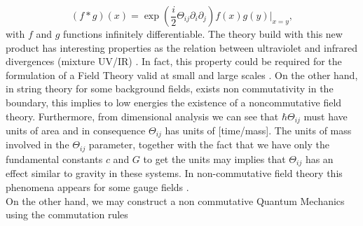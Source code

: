 \documentclass[a4paper,12pt]{article}
\begin{document}
\begin{equation}
(f*g)(x)=\exp (\frac{i}{2}\Theta_{ij}\partial_{i}\partial_{j})f(x)g(y)|_{x=y},
\end{equation}
with $f$ and $g$ functions infinitely differentiable. The theory
build with this new product has interesting properties as the
relation between ultraviolet and infrared divergences (mixture
UV/IR) \cite{minwalla:gnus}. In fact, this property could be
required for the formulation of a Field Theory valid at small and
large scales \cite{cohen:gnus}. On the other hand, in string
theory for some background fields, exists non commutativity in the
boundary, this implies to low energies the existence of a
noncommutative field theory. Furthermore, from dimensional
analysis we can see that $\hbar \Theta_{ij}$ must have units of
area and in consequence $\Theta_{ij}$  has units of [time/mass].
The units of mass involved in the $\Theta_{ij}$ parameter,
together with the fact that we have only the fundamental constants
$c$ and $G$ to get the units may implies that $\Theta_{ij}$ has an
effect similar to gravity in these systems. In non-commutative
field theory this phenomena appears for some gauge
fields \cite{rivelles:gnus}.\\

On the other hand, we may construct a non commutative Quantum
Mechanics using the commutation rules
\end{document}
